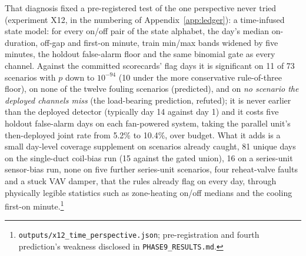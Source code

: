 \documentclass[11pt,letterpaper]{article}
\begin{document}
That diagnosis fixed a pre-registered test of the one perspective never tried (experiment X12, in the numbering of Appendix~\ref{app:ledger}): a time-infused state model: for every on/off pair of the state alphabet, the day's median on-duration, off-gap and first-on minute, train min/max bands widened by five minutes, the holdout false-alarm floor and the same binomial gate as every channel. Against the committed scorecards' flag days it is significant on 11 of 73 scenarios with $p$ down to $10^{-94}$ (10 under the more conservative rule-of-three floor), on none of the twelve fouling scenarios (predicted), and on \emph{no scenario the deployed channels miss} (the load-bearing prediction, refuted); it is never earlier than the deployed detector (typically day 14 against day 1) and it costs five holdout false-alarm days on each fan-powered system, taking the parallel unit's then-deployed joint rate from 5.2\% to 10.4\%, over budget. What it adds is a small day-level coverage supplement on scenarios already caught, 81 unique days on the single-duct coil-bias run (15 against the gated union), 16 on a series-unit sensor-bias run, none on five further series-unit scenarios, four reheat-valve faults and a stuck VAV damper, that the rules already flag on every day, through physically legible statistics such as zone-heating on/off medians and the cooling first-on minute.\footnote{\texttt{outputs/x12\_time\_perspective.json}; pre-registration and fourth prediction's weakness disclosed in \texttt{PHASE9\_RESULTS.md}.}
\end{document}
